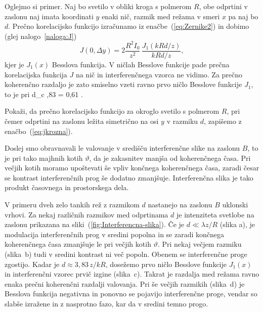 Oglejmo si primer. Naj bo svetilo v obliki kroga 
s polmerom $R$, obe odprtini v zaslonu naj imata koordinati $y$  enaki nič, razmik
med režama v smeri $x$ pa naj bo $d$. 
Prečno korelacijsko funkcijo izračunamo iz enačbe~(\ref{eq:Zernike2}) in dobimo 
(glej nalogo~\ref{naloga:J})
\begin{equation}
J(0,\Delta y)=2\frac{R^{2}I_{0}}{z^{2}}\,\frac{J_{1}(kRd/z)}{kRd/z},
\label{eq:jkrozna}
\end{equation}
kjer je $J_{1}(x)$ Besslova funkcija. V ničlah Besslove funkcije
pade prečna korelacijska funkcija $J$ na nič in interferenčnega vzorca ne vidimo. 
Za prečno koherenčno razdaljo je zato smiselno vzeti ravno prvo ničlo Besslove funkcije
$J_1$, to je pri
\beq
\label{eq:okroglo_svetilo}
d_{c} ,83  = 0,61 .
\eeq
\begin{definition}
\label{naloga:J}
Pokaži, da prečno korelacijsko funkcijo za okroglo svetilo s polmerom $R$, pri čemer
odprtini na zaslonu ležita simetrično na osi $y$ v razmiku $d$, zapišemo z enačbo~(\ref{eq:jkrozna}). 
\end{definition}

Doslej smo obravnavali le valovanje v središču interferenčne slike na
zaslonu $B$, to je pri tako majhnih kotih $\vartheta$, da je zakasnitev
manjša od koherenčnega časa. Pri večjih kotih moramo upoštevati še
vpliv končnega koherenčnega časa, zaradi česar se kontrast interferenčnih
prog še dodatno zmanjšuje. Interferenčna slika je 
tako produkt časovnega in prostorskega dela. 

V primeru dveh zelo tankih rež z razmikom $d$ nastanejo na zaslonu
$B$ uklonski vrhovi. Za nekaj različnih razmikov med odprtinama $d$ je intenziteta
svetlobe na zaslonu prikazana na sliki~(\ref{fig:Interferencna-slika}).
Če je $d\ll\lambda z/R$ (slika a), je modulacija interferenčnih prog v sredini
popolna in se zaradi končnega koherenčnega časa zmanjšuje le pri večjih
kotih $\vartheta$. Pri nekaj večjem razmiku (slika~b) tudi v sredini kontrast
ni več popoln. Obenem se interferenčne proge zgostijo. Kadar je $d\approx 3,83\,z/kR$,
dosežemo prvo ničlo Besslove funkcije $J_{1}(x)$ in interferenčni vzorec
prvič izgine (slika~c). Takrat je razdalja med režama ravno enaka prečni
koherenčni razdalji valovanja. Pri še večjih razmikih (slika~d) 
je Besslova funkcija negativna in ponovno se pojavijo interferenčne proge, 
vendar so slabše izražene in z nasprotno fazo, kar da v sredini temno progo. 

